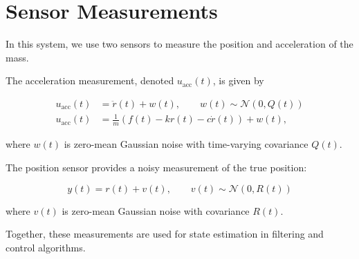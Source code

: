 \section{Sensor Measurements}

In this system, we use two sensors to measure the position 
and acceleration of the mass.

The acceleration measurement, denoted \( u_{\text{acc}}(t) \), 
is given by

\begin{equation}
    \begin{aligned}
        u_{\text{acc}}(t) &= \ddot{r}(t) + w(t), 
        \quad\quad w(t) \sim \mathcal{N}(0, Q(t)) \\
        u_{\text{acc}}(t) &= \frac{1}{m} \left( f(t) - k r(t) - c \dot{r}(t) \right) + w(t), 
    \end{aligned}
    \label{eq:acc_measurement}
\end{equation}


where \( w(t) \) is zero-mean Gaussian noise with time-varying 
covariance \( Q(t) \).
\clearpage

The position sensor provides a noisy measurement of the true position:

\begin{equation}
    y(t) = r(t) + v(t),
    \quad\quad v(t) \sim \mathcal{N}(0, R(t))
    \label{eq:pos_measurement}
\end{equation}

where \( v(t) \) is zero-mean Gaussian noise with covariance \( R(t) \).

Together, these measurements are used for state estimation in 
filtering and control algorithms.